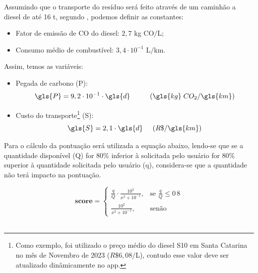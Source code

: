 Assumindo que o transporte do resíduo será feito através de um caminhão a diesel de até 16 \gls{t}, segundo \textcite{bartholomeu_quantificacao_2006}, podemos definir as constantes:

\begin{itemize} 
	\item Fator de emissão de \gls{CO} do diesel: $2,7$ \gls{kg} \gls{CO}$/$\gls{L};
  \item Consumo médio de combustível: $ 3,4 \cdot 10^{-1} $ \gls{L}$/$\gls{km}.
\end{itemize}

Assim, temos as variáveis: 

\begin{itemize} 
	\item Pegada de carbono (\gls{P}): 
  \begin{equation}\label{eq:Eq_1}
    \gls{P} = 9,2 \cdot 10^{-1} \cdot \gls{d} \hspace{10mm} (\gls{kg} \hspace{1mm} CO_{2}/\gls{km})
  \end{equation}
	\item Custo do transporte\footnote{Como exemplo, foi utilizado o preço médio do diesel S10 em Santa Catarina no mês de Novembro de 2023 ($R\$6,08/$\gls{L}), contudo esse valor deve ser atualizado dinâmicamente no app.} (S): 
  \begin{equation}\label{eq:custo} 
    \gls{S} = 2,1 \cdot \gls{d} \hspace{5mm} (R\$/\gls{km})
  \end{equation}  
\end{itemize}

Para o cálculo da pontuação será utilizada a equação abaixo, lendo-se que se a quantidade disponível (\gls{Q}) for 80\% inferior à solicitada pelo usuário  for 80\% superior à quantidade solicitada pelo usuário (\gls{q}), considera-se que a quantidade não terá impacto na pontuação.

\begin{equation}\label{eq:pont}
      \textbf{score} = 
  \begin{cases}
      \frac{q}{Q} \cdot \frac{10^2}{x^2 + 10^{-1}},& \text{se } \frac{q}{Q} \leq 0\,8\\
      \frac{10^2}{x^2 + 10^{-1}},              & \text{senão}
  \end{cases}
\end{equation}
\\
